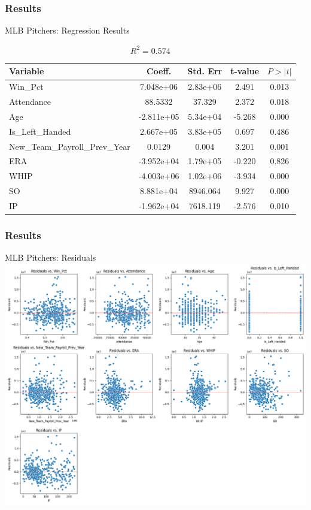 \documentclass[9pt]{beamer}
\begin{document}
\begin{frame}
    \frametitle{Results}
    \begin{block}{MLB Pitchers: Regression Results}
        \begin{table}[ht]
            \centering
            \caption{\( R^2 = 0.574 \)}
            \begin{tabular}{lcccc}
                \toprule
                Variable & Coeff. & Std. Err & t-value & $P > |t|$ \\
                \midrule
                \rowcolor{red!20} Win\_Pct & 7.048e+06 & 2.83e+06 & 2.491 & 0.013 \\
                \rowcolor{red!20} Attendance & 88.5332 & 37.329 & 2.372 & 0.018 \\
                \rowcolor{red!20} Age & -2.811e+05 & 5.34e+04 & -5.268 & 0.000 \\
                Is\_Left\_Handed & 2.667e+05 & 3.83e+05 & 0.697 & 0.486 \\
                \rowcolor{red!20} New\_Team\_Payroll\_Prev\_Year & 0.0129 & 0.004 & 3.201 & 0.001 \\
                ERA & -3.952e+04 & 1.79e+05 & -0.220 & 0.826 \\
                \rowcolor{red!20} WHIP & -4.003e+06 & 1.02e+06 & -3.934 & 0.000 \\
                \rowcolor{red!20} SO & 8.881e+04 & 8946.064 & 9.927 & 0.000 \\
                \rowcolor{red!20} IP & -1.962e+04 & 7618.119 & -2.576 & 0.010 \\
                \bottomrule
            \end{tabular}
        \end{table}        
    \end{block}
\end{frame}
\begin{frame}
    \frametitle{Results}
    \begin{block}{MLB Pitchers: Residuals}
        \centering
        \includegraphics[height=0.75\textheight,keepaspectratio]{images/mlb_pitchers_residuals.png}
    \end{block}
\end{frame}
\end{document}
